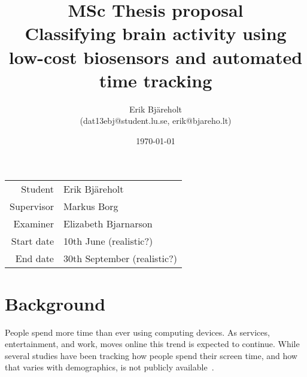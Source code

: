 \documentclass{IEEEtran}
\title{%
    \large MSc Thesis proposal \\
    \huge Classifying brain activity using low-cost biosensors and automated time tracking \\
}
\author{Erik Bjäreholt \\(dat13ebj@student.lu.se, erik@bjareho.lt)}
\date{\today}
\begin{document}
\maketitle

\begin{center}
\begin{tabular}{ r l }
 Student & Erik Bjäreholt \\
 Supervisor & Markus Borg \\
 Examiner & Elizabeth Bjarnarson \\
 Start date & 10th June (realistic?) \\
 End date & 30th September (realistic?) \\
\end{tabular}
\end{center}

\tableofcontents

\begin{comment}
\section{Requirements for this document}

The process for CS students: http://cs.lth.se/examensarbete/hur-gaar-det-till/
General CS dep resource: http://cs.lth.se/examensarbete/
General LTH resource: http://www.student.lth.se/studieinformation/examensarbete/examensarbetsprocessen/

 - [ ] Arbetstitel, inblandades namn och kontaktuppgifter samt preliminärt start- och slutdatum.
 - [ ] Bakgrund/kontext och motiv för examensarbetet.
 - [ ] Övergripande mål och problemställningar/forskningsfrågor.
 - [ ] Angreppssätt/metodik och metoder.
 - [ ] Vetenskaplig grund och beprövad erfarenhet som examensarbetet ska bygga vidare på. Detta kan t ex beskrivas i form av ett par nyckelreferenser till artiklar eller annat underlag.
 - [ ] Hur förväntas examensarbetet bidra till kunskapsutvecklingen?
 - [ ] Preliminär beskrivning av resurser som krävs för arbetets genomförande, t ex arbetsplats och utrustning, och hur dessa ordnas och finns tillgängliga.

\end{comment}

\section{Background}

People spend more time than ever using computing devices\cite{TODO}. As services, entertainment, and work, moves online this trend is expected to continue. While several studies have been tracking how people spend their screen time, and how that varies with demographics, is not publicly available~\cite{TODO}.
\end{document}
